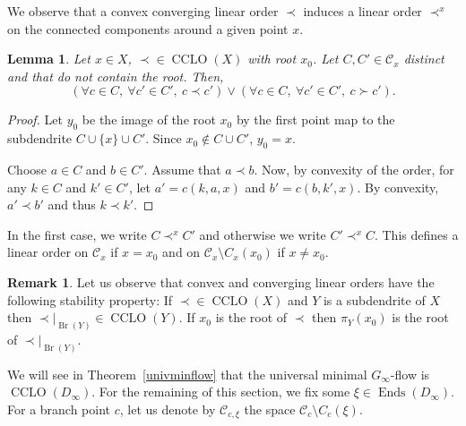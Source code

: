 \documentclass[JEP,XML,SOM,Unicode,NoFloatCountersInSection]{cedram}
\let\mathcal\mathscr
\theoremstyle{plain}
\newtheorem{lem}[thm]{Lemma}
\theoremstyle{definition}
\newtheorem{rem}[thm]{Remark}
\newcommand{\cC}{\mathcal{C}}
\DeclareMathOperator{\Ends}{Ends}
\DeclareMathOperator{\Br}{Br}
\DeclareMathOperator{\CLO}{CCLO}
\begin{document}
We observe that a convex converging linear order $\prec$ induces a linear order $\prec^x$ on the connected components around a given point $x$.

\begin{lem}\label{obsorder}Let $x\in X$, ${\prec}{}\in \CLO(X)$ with root $x_0$. Let $C,C'\in\cC_x$ distinct and that do not contain the root. Then,
\[
(\forall c\in C,\ \forall c'\in C',\ c\prec c')\lor (\forall c\in C,\ \forall c'\in C',\ c\succ c').
\]
\end{lem}

\begin{proof} Let $y_0$ be the image of the root $x_0$ by the first point map to the subdendrite $C\cup\{x\}\cup C'$. Since $x_0\notin C\cup C'$, $y_0=x$.

Choose $a\in C$ and $b\in C'$. Assume that $a\prec b$. Now, by convexity of the order, for any $k\in C$ and $k'\in C'$, let $a'=c(k,a,x)$ and $b'=c(b,k',x)$. By convexity, $a'\prec b'$ and thus $k\prec k'$.
\end{proof}

In the first case, we write $C\prec^x C'$ and otherwise we write $C'\prec^x C$. This defines a linear order on $\cC_x$ if $x=x_0$ and on $\cC_x\setminus C_x(x_0)$ if $x\neq x_0$.

\begin{rem}Let us observe that convex and converging linear orders have the following stability property: If ${\prec}\in\CLO(X)$ and $Y$ is a subdendrite of $X$ then ${\prec}|_{\Br(Y)}\in\CLO(Y)$. If $x_0$ is the root of $\prec$ then $\pi_Y(x_0)$ is the root of $\prec |_{\Br(Y)}$.
\end{rem}
We will see in Theorem~\ref{univminflow} that the universal minimal $G_\infty$-flow is $\CLO(D_\infty)$. For the remaining of this section, we fix some $\xi\in\Ends(D_\infty)$. For a branch point $c$, let us denote by $\cC_{c,\xi}$ the space $\cC_c\setminus C_c(\xi)$.
\end{document}
